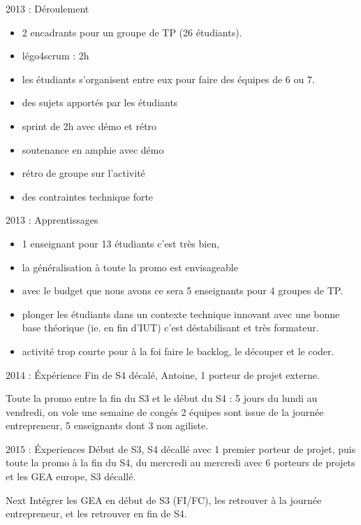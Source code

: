 \documentclass{beamer}
\begin{document}
\begin{frame}{2013 : Déroulement}
  \begin{itemize}
    \item 2 encadrants pour un groupe de TP (26 étudiants).
    \item légo4scrum : 2h
    \item les étudiants s'organisent entre eux pour faire des équipes de 6 ou 7.
    \item des sujets apportés par les étudiants
    \item sprint de 2h avec démo et rétro
    \item soutenance en amphie avec démo
    \item rétro de groupe sur l'activité
    \item des contraintes technique forte
  \end{itemize}
\end{frame}

\begin{frame}{2013 : Apprentissages}
  \begin{itemize}
    \item 1 enseignant pour 13 étudiants c'est très bien,
    \item la généralisation à toute la promo est envisageable
    \item avec le budget que nous avons ce sera 5 enseignants pour 4 groupes de TP.
    \item plonger les étudiants dans un contexte technique innovant avec une bonne base théorique (ie. en fin d'IUT) c'est déstabilisant et très formateur. 
    \item activité trop courte pour à la foi faire le backlog, le découper et le coder.
  \end{itemize}
\end{frame}

\begin{frame}{2014 : Éxpérience}
  Fin de S4 décalé, Antoine, 1 porteur de projet externe.

  Toute la promo entre la fin du S3 et le début du S4 : 5 jours du lundi au vendredi, on vole une semaine de congés
  2 équipes sont issue de la journée entrepreneur, 5 enseignants dont 3 non agiliste.
\end{frame}
\begin{frame}{2015 : Éxperiences}
  Début de S3, S4 décallé avec 1 premier porteur de projet, puis toute la promo à la fin du S4, du mercredi au mercredi avec 6 porteurs de projets et les GEA europe, S3 décallé.
\end{frame}
\begin{frame}{Next}
  Intégrer les GEA en début de S3 (FI/FC), les retrouver à la journée entrepreneur, et les retrouver en fin de S4. 
\end{frame}
\end{document}
